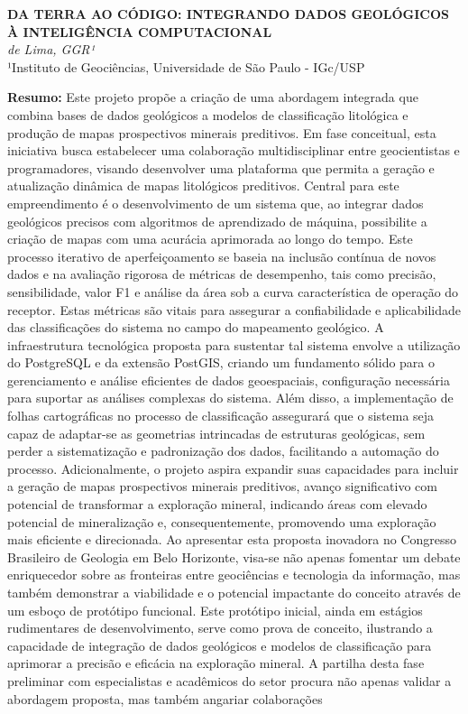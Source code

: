 \documentclass{article}
\begin{document}
\begin{center}
    \fontsize{12}{14}\textbf{\uppercase{Da terra ao código: Integrando Dados Geológicos à Inteligência Computacional}}\\
    \fontsize{11}{13}\textit{de Lima, GGR¹}\\
    \fontsize{10}{12}¹Instituto de Geociências, Universidade de São Paulo - IGc/USP\\
\end{center}

\par{
    \fontsize{12}{14}\textbf{Resumo: }Este projeto propõe a criação de uma abordagem integrada que combina bases de dados geológicos a modelos de classificação litológica e produção de mapas prospectivos minerais preditivos. Em fase conceitual, esta iniciativa busca estabelecer uma colaboração multidisciplinar entre geocientistas e programadores, visando desenvolver uma plataforma que permita a geração e atualização dinâmica de mapas litológicos preditivos. Central para este empreendimento é o desenvolvimento de um sistema que, ao integrar dados geológicos precisos com algoritmos de aprendizado de máquina, possibilite a criação de mapas com uma acurácia aprimorada ao longo do tempo. Este processo iterativo de aperfeiçoamento se baseia na inclusão contínua de novos dados e na avaliação rigorosa de métricas de desempenho, tais como precisão, sensibilidade, valor F1 e análise da área sob a curva característica de operação do receptor. Estas métricas são vitais para assegurar a confiabilidade e aplicabilidade das classificações do sistema no campo do mapeamento geológico. A infraestrutura tecnológica proposta para sustentar tal sistema envolve a utilização do PostgreSQL e da extensão PostGIS, criando um fundamento sólido para o gerenciamento e análise eficientes de dados geoespaciais, configuração necessária para suportar as análises complexas do sistema. Além disso, a implementação de folhas cartográficas no processo de classificação assegurará que o sistema seja capaz de adaptar-se as geometrias intrincadas de estruturas geológicas, sem perder a sistematização e padronização dos dados, facilitando a automação do processo. Adicionalmente, o projeto aspira expandir suas capacidades para incluir a geração de mapas prospectivos minerais preditivos, avanço significativo com potencial de transformar a exploração mineral, indicando áreas com elevado potencial de mineralização e, consequentemente, promovendo uma exploração mais eficiente e direcionada. Ao apresentar esta proposta inovadora no Congresso Brasileiro de Geologia em Belo Horizonte, visa-se não apenas fomentar um debate enriquecedor sobre as fronteiras entre geociências e tecnologia da informação, mas também demonstrar a viabilidade e o potencial impactante do conceito através de um esboço de protótipo funcional. Este protótipo inicial, ainda em estágios rudimentares de desenvolvimento, serve como prova de conceito, ilustrando a capacidade de integração de dados geológicos e modelos de classificação para aprimorar a precisão e eficácia na exploração mineral. A partilha desta fase preliminar com especialistas e acadêmicos do setor procura não apenas validar a abordagem proposta, mas também angariar colaborações }
\end{document}
